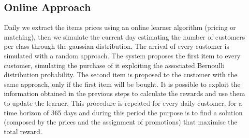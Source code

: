\subsection{Online Approach}
Daily we extract the items prices using an online learner algorithm (pricing or matching), then we simulate the current day estimating the number of customers per class through the gaussian distribution. The arrival of every customer is simulated with a random approach. The system proposes the first item to every customer, simulating the purchase of it exploiting the associated Bernoulli distribution probability. The second item is proposed to the customer with the same approach, only if the first item will be bought. It is possible to exploit the information obtained in the previous steps to calculate the rewards and use them to update the learner. This procedure is repeated for every daily customer, for a time horizon of 365 days and during this period the purpose is to find a solution (composed by the prices and the assignment of promotions) that maximise the total reward. 